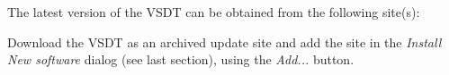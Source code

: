 The latest version of the VSDT can be obtained from the following site(s):
\begin{center}
	\downloadsites
\end{center}

Download the VSDT as an archived update site and add the site in the \emph{Install
New software} dialog (see last section), using the \emph{Add...} button.

